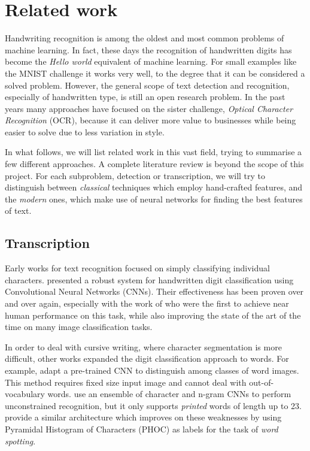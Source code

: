 

\section{Related work}\label{sec:related_work}
	Handwriting recognition is among the oldest and most common problems of machine learning. In fact, these days the recognition of handwritten digits has become the \textit{Hello world} equivalent of machine learning. For small examples like the MNIST challenge it works very well, to the degree that it can be considered a solved problem. However, the general scope of text detection and recognition, especially of handwritten type, is still an open research problem. In the past years many approaches have focused on the sister challenge, \emph{Optical Character Recognition} (OCR), because it can deliver more value to businesses while being easier to solve due to less variation in style.

	In what follows, we will list related work in this vast field, trying to summarise a few different approaches. A complete literature review is beyond the scope of this project. For each subproblem, detection or transcription, we will try to distinguish between \emph{classical} techniques which employ hand-crafted features, and the \emph{modern} ones, which make use of neural networks for finding the best features of text.


	\subsection{Transcription}
		Early works for text recognition focused on simply classifying individual characters.  presented a robust system for handwritten digit classification using Convolutional Neural Networks (CNNs). Their effectiveness has been proven over and over again, especially with the work of \citet{ciresan} who were the first to achieve near human performance on this task, while also improving the state of the art of the time on many image classification tasks.

		In order to deal with cursive writing, where character segmentation is more difficult, other works expanded the digit classification approach to words. For example, \citet{sharma2015adapting} adapt a pre-trained CNN to distinguish among classes of word images. This method requires fixed size input image and cannot deal with out-of-vocabulary words.  use an ensemble of character and n-gram CNNs to perform unconstrained recognition, but it only supports \emph{printed} words of length up to 23.  provide a similar architecture which improves on these weaknesses by using Pyramidal Histogram of Characters (PHOC) as labels for the task of \emph{word spotting}.

